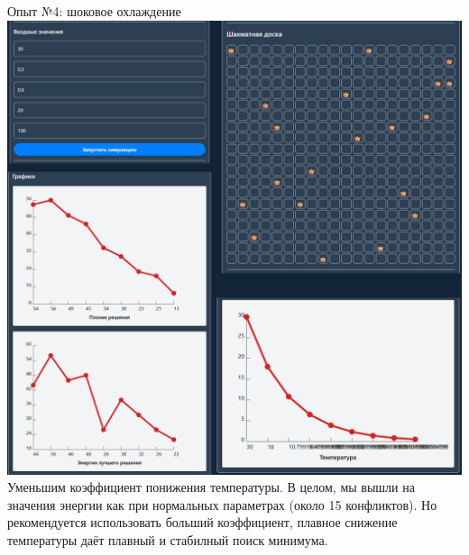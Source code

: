 \documentclass[a4paper,14pt]{extarticle}
\begin{document}
Опыт №4: шоковое охлаждение\\
\includegraphics[width=140mm]{report4}\\
Уменьшим коэффициент понижения температуры. В целом, мы вышли на значения энергии как при нормальных параметрах (около 15 конфликтов). 
Но рекомендуется использовать больший коэффициент, плавное снижение температуры даёт плавный и стабилный поиск минимума.\bigbreak
\end{document}
